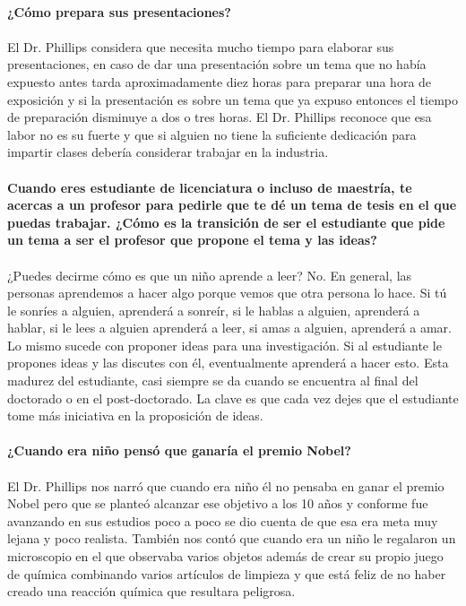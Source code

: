 \documentclass[10pt,letterpaper]{article}
\begin{document}
\\
\textbf{¿Cómo prepara sus presentaciones?}
\\
\\
El Dr. Phillips considera que necesita mucho tiempo para elaborar sus presentaciones, en caso de dar una presentación sobre un tema que no había expuesto antes tarda aproximadamente diez horas para preparar una hora de exposición y si la presentación es sobre un tema que ya expuso entonces el tiempo de preparación disminuye a dos o tres horas. El Dr. Phillips reconoce que esa labor no es su fuerte y que si alguien no tiene la suficiente dedicación para impartir clases debería considerar trabajar en la industria.
\\
\\
\textbf{Cuando eres estudiante de licenciatura o incluso de maestría, te acercas a un profesor para pedirle que te dé un tema de tesis en el que puedas trabajar. ¿Cómo es la transición de ser el estudiante que pide un tema a ser el profesor que propone el tema y las ideas?}
\\
\\
¿Puedes decirme cómo es que un niño aprende a leer? No. En general, las personas aprendemos a hacer algo porque vemos que otra persona lo hace. Si tú le sonríes a alguien, aprenderá a sonreír, si le hablas a alguien, aprenderá a hablar, si le lees a alguien aprenderá a leer, si amas a alguien, aprenderá a amar. Lo mismo sucede con proponer ideas para una investigación. Si al estudiante le propones ideas y las discutes con él, eventualmente aprenderá a hacer esto. Esta madurez del estudiante, casi siempre se da cuando se encuentra al final del doctorado o en el post-doctorado. La clave es que cada vez dejes que el estudiante tome más iniciativa en la proposición de ideas.
\\
\\
\textbf{¿Cuando era niño pensó que ganaría el premio Nobel?}
\\
\\
El Dr. Phillips nos narró que cuando era niño él no pensaba en ganar el premio Nobel pero que se planteó alcanzar ese objetivo a los 10 años y conforme fue avanzando en sus estudios poco a poco se dio cuenta de que esa era meta muy lejana y poco realista. También nos contó que cuando era un niño le regalaron un microscopio en el que observaba varios objetos además de crear su propio juego de química combinando varios artículos de limpieza y que está feliz de no haber creado una reacción química que resultara peligrosa.
\\
\end{document}
